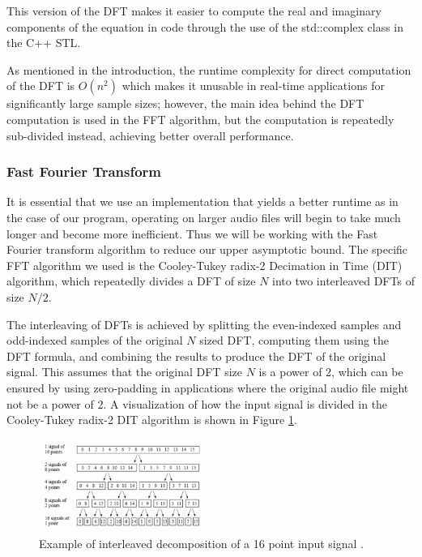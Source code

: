 \documentclass[journal]{IEEEtran}
\begin{document}
	\par{
		This version of the DFT makes it easier to compute the real and
		imaginary components of the equation in code through the use of 
		the std::complex class in the C++ STL.
	}

	\par{
		As mentioned in the introduction, the runtime complexity for direct
		computation of the DFT is $O(n^2)$ which makes it unusable in real-time
		applications for significantly large sample sizes; however, the main
		idea behind the DFT computation is used in the FFT algorithm, but the 
		computation is repeatedly sub-divided instead, 
		achieving better overall performance.
	}

\subsubsection{Fast Fourier Transform}
	\par {
		It is essential that we use an implementation that yields a 
		better runtime as in the case of our program, operating on 
		larger audio files will begin to take much longer and become more 
		inefficient. Thus we will be working with the 
		Fast Fourier transform algorithm to reduce our upper 
		asymptotic bound. The specific FFT algorithm we used is the Cooley-Tukey 
		radix-2 Decimation in Time (DIT) algorithm, which repeatedly divides a 
		DFT of size $N$ into two interleaved DFTs of size $N / 2$.
	}
	\par{
		The interleaving of DFTs is achieved by splitting the even-indexed samples
		and odd-indexed samples of the original $N$ sized DFT, computing them using
		the DFT formula, and combining the results to produce the DFT of the 
		original signal. This assumes that the original DFT size $N$ is a 
		power of 2, which can be ensured by using zero-padding in applications 
		where the original audio file might not be a power of 2.
		A visualization of how the input signal is divided in the Cooley-Tukey
		radix-2 DIT algorithm is shown in Figure \ref{fig:dft-decomp}.
	}
	\begin{figure}[h]
		\centering
		\includegraphics[width=0.5\textwidth]{dft-decomp}
		\caption{Example of interleaved decomposition of a 16 point input signal
		\cite{DspGuide}.}
		\label{fig:dft-decomp}
	\end{figure}
\end{document}
